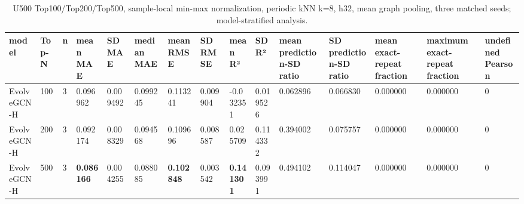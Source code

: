 \begin{table}
\centering
\small
\caption{U500 Top100/Top200/Top500, sample-local min-max normalization, periodic kNN k=8, h32, mean graph pooling, three matched seeds; model-stratified analysis.}
\begin{tabular}{lllllllllllllll}
\hline
model & Top-N & n & mean MAE & SD MAE & median MAE & mean RMSE & SD RMSE & mean R² & SD R² & mean prediction-SD ratio & SD prediction-SD ratio & mean exact-repeat fraction & maximum exact-repeat fraction & undefined Pearson \\
\hline
EvolveGCN-H & 100 & 3 & 0.096962 & 0.009492 & 0.099245 & 0.113241 & 0.009904 & -0.032351 & 0.019526 & 0.062896 & 0.066830 & 0.000000 & 0.000000 & 0 \\
EvolveGCN-H & 200 & 3 & 0.092174 & 0.008329 & 0.094568 & 0.109696 & 0.008587 & 0.025709 & 0.114332 & 0.394002 & 0.075757 & 0.000000 & 0.000000 & 0 \\
EvolveGCN-H & 500 & 3 & \textbf{0.086166} & 0.004255 & 0.088085 & \textbf{0.102848} & 0.003542 & \textbf{0.141301} & 0.093991 & 0.494102 & 0.114047 & 0.000000 & 0.000000 & 0 \\
\hline
\end{tabular}
\end{table}
